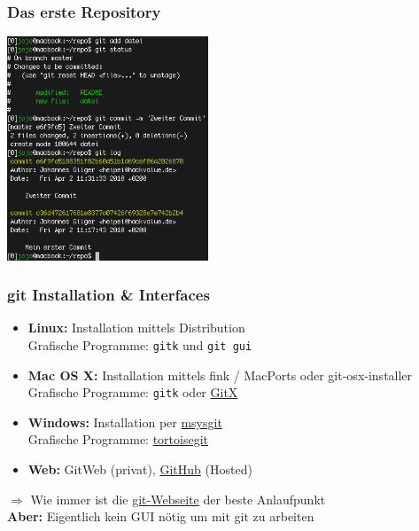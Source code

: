 \begin{frame}
  \frametitle{Das erste Repository}
  \vspace{-0.3cm}
  \begin{center}
    \includegraphics[width=6cm]{img/tutorial_3.png}
  \end{center}
\end{frame}

\begin{frame}
  \frametitle{git Installation \& Interfaces}
  \begin{itemize}
    \item {\bf Linux:} Installation mittels Distribution \\ Grafische Programme: {\tt gitk} und {\tt git gui}
    \item {\bf Mac OS X:} Installation mittels fink / MacPorts oder git-osx-installer \\ Grafische Programme: {\tt gitk} oder \href{http://gitx.frim.nl/}{GitX}
    \item {\bf Windows:} Installation per \href{http://code.google.com/p/msysgit/}{msysgit} \\ Grafische Programme: \href{http://code.google.com/p/tortoisegit/}{tortoisegit}
    \item {\bf Web:} GitWeb (privat), \href{http://github.com}{GitHub} (Hosted)
  \end{itemize}
  \begin{center}
  $\Rightarrow$ Wie immer ist die \href{http://git-scm.com}{git-Webseite} der beste Anlaufpunkt \\
  {\bf Aber:} Eigentlich kein GUI nötig um mit git zu arbeiten
  \end{center}

\end{frame}

